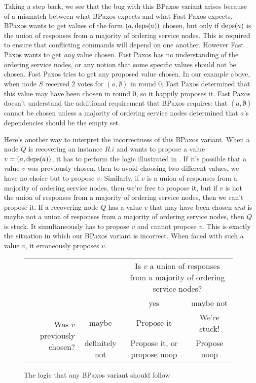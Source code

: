 \documentclass{mwhittaker}
\begin{document}
Taking a step back, we see that the bug with this BPaxos variant arises because
of a mismatch between what BPaxos expects and what Fast Paxos expects. BPaxos
wants to get values of the form $(a, \text{deps}(a))$ chosen, but only if $\text{deps}(a)$
is the union of responses from a majority of ordering service nodes. This is
required to ensure that conflicting commands will depend on one another.
However Fast Paxos wants to get \emph{any} value chosen. Fast Paxos has no
understanding of the ordering service nodes, or any notion that some specific
values should not be chosen. Fast Paxos tries to get any proposed value chosen.
In our example above, when node $S$ received 2 votes for $(a, \emptyset)$ in
round 0, Fast Paxos determined that this value may have been chosen in round 0,
so it happily proposes it. Fast Paxos doesn't understand the additional
requirement that BPaxos requires: that $(a, \emptyset)$ cannot be chosen unless
a majority of ordering service nodes determined that $a$'s dependencies should
be the empty set.

Here's another way to interpret the incorrectness of this BPaxos variant. When
a node $Q$ is recovering an instance $R.i$ and wants to propose a value $v =
(a, \text{deps}(a))$, it has to perform the logic illustrated in
.
%
If it's possible that a value $v$ was previously chosen, then to avoid choosing
two different values, we have no choice but to propose $v$.
%
Similarly, if $v$ is a union of responses from a majority of ordering service
nodes, then we're free to propose it, but if $v$ is not the union of responses
from a majority of ordering service nodes, then we can't propose it.
%
If a recovering node $Q$ has a value $v$ that may have been chosen \emph{and}
is maybe not a union of responses from a majority of ordering service nodes,
then $Q$ is stuck. It simultaneously has to propose $v$ and cannot propose $v$.
This is exactly the situation in which our BPaxos variant is incorrect. When
faced with such a value $v$, it erroneously proposes $v$.

\begin{figure}[h]
  \centering
  \begin{tabular}{rccc}
    &
    &
    \multicolumn{2}{p{3in}}{%
      Is $v$ a union of responses from a majority of ordering service nodes?%
    } \\
    &
    &
    yes &
    maybe not \\\cline{3-4}
    \multirow{2}{1.8in}{Was $v$ previously chosen?} &
    maybe &
    \multicolumn{1}{|c|}{Propose it} &
    \multicolumn{1}{|c|}{We're stuck!} \\\cline{3-4}
    &
    definitely not &
    \multicolumn{1}{|c|}{Propose it, or propose noop} &
    \multicolumn{1}{|c|}{Propose noop} \\\cline{3-4}
  \end{tabular}
  \caption{The logic that any BPaxos variant should follow}%
\end{figure}
\end{document}
